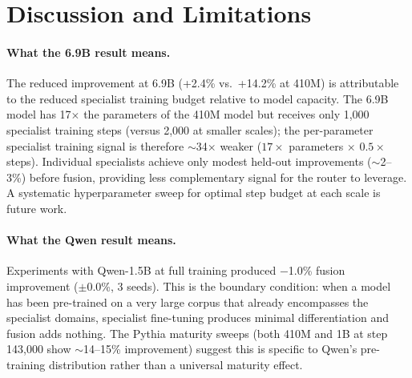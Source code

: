 \documentclass{article}
\begin{document}
\section{Discussion and Limitations}
\label{sec:discussion}

\paragraph{What the 6.9B result means.} The reduced improvement at 6.9B (+2.4\% vs.\ +14.2\% at 410M) is attributable to the reduced specialist training budget relative to model capacity. The 6.9B model has 17$\times$ the parameters of the 410M model but receives only 1,000 specialist training steps (versus 2,000 at smaller scales); the per-parameter specialist training signal is therefore $\sim$34$\times$ weaker ($17\times$ parameters $\times$ $0.5\times$ steps). Individual specialists achieve only modest held-out improvements ($\sim$2--3\%) before fusion, providing less complementary signal for the router to leverage. A systematic hyperparameter sweep for optimal step budget at each scale is future work.

\paragraph{What the Qwen result means.} Experiments with Qwen-1.5B at full training produced $-$1.0\% fusion improvement ($\pm$0.0\%, 3 seeds). This is the boundary condition: when a model has been pre-trained on a very large corpus that already encompasses the specialist domains, specialist fine-tuning produces minimal differentiation and fusion adds nothing. The Pythia maturity sweeps (both 410M and 1B at step 143,000 show $\sim$14--15\% improvement) suggest this is specific to Qwen's pre-training distribution rather than a universal maturity effect.
\end{document}
